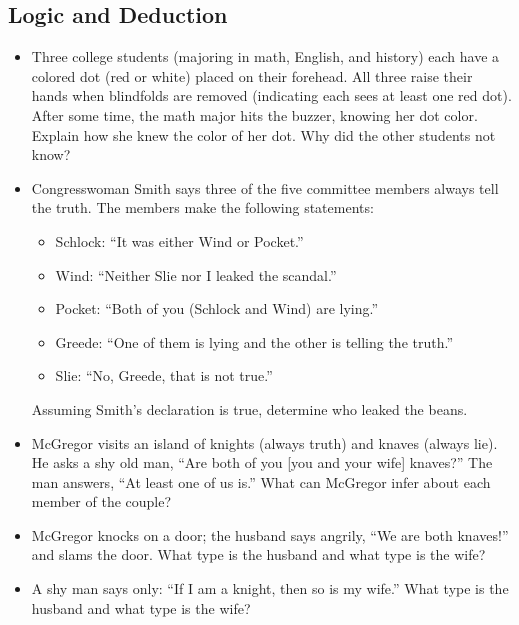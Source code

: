 \documentclass[12pt]{article}
\begin{document}
\subsection{Logic and Deduction}
\begin{itemize}
  \item Three college students (majoring in math, English, and history) each have a colored dot (red or white) placed on their forehead. All three raise their hands when blindfolds are removed (indicating each sees at least one red dot). After some time, the math major hits the buzzer, knowing her dot color. Explain how she knew the color of her dot. Why did the other students not know?

  \item Congresswoman Smith says three of the five committee members always tell the truth. The members make the following statements:
  \begin{itemize}
    \item Schlock: ``It was either Wind or Pocket.''
    \item Wind: ``Neither Slie nor I leaked the scandal.''
    \item Pocket: ``Both of you (Schlock and Wind) are lying.''
    \item Greede: ``One of them is lying and the other is telling the truth.''
    \item Slie: ``No, Greede, that is not true.''
  \end{itemize}
  Assuming Smith's declaration is true, determine who leaked the beans.

  \item McGregor visits an island of knights (always truth) and knaves (always lie). He asks a shy old man, ``Are both of you [you and your wife] knaves?'' The man answers, ``At least one of us is.'' What can McGregor infer about each member of the couple?

  \item McGregor knocks on a door; the husband says angrily, ``We are both knaves!'' and slams the door. What type is the husband and what type is the wife?

  \item A shy man says only: ``If I am a knight, then so is my wife.'' What type is the husband and what type is the wife?
\end{itemize}
\end{document}
